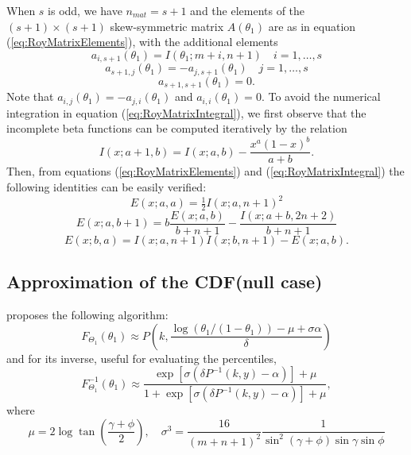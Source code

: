 When $s$ is odd, we have $n_{mat} = s+1$ and the elements of the $(s+1) \times (s+1)$ skew-symmetric matrix $A(\theta_1)$ are as in equation (\ref{eq:RoyMatrixElements}), with the additional elements
\begin{equation}
	a_{i,s+1}(\theta_1) = I(\theta_1;m + i,n + 1) \quad i = 1, \ldots, s 
\end{equation}
\begin{equation}
	a_{s+1,j}(\theta_1) = -a_{j,s+1}(\theta_1) \quad j = 1, \ldots, s 
\end{equation}
\begin{equation}
	a_{s+1,s+1}(\theta_1) = 0.
\end{equation}
Note that $a_{i,j}(\theta_1) = -a_{j,i}(\theta_1)$ and $a_{i,i}(\theta_1)=0$. To avoid the numerical integration in equation (\ref{eq:RoyMatrixIntegral}), we first observe that the incomplete beta functions can be computed iteratively by the relation
\begin{equation}
	I(x;a+1,b) = I(x;a,b) - \frac{x^a(1-x)^b}{a+b}.
\end{equation}
Then, from equations (\ref{eq:RoyMatrixElements}) and (\ref{eq:RoyMatrixIntegral}) the following identities can be easily verified:
\begin{equation}
	E(x;a,a) = \tfrac{1}{2} I(x;a,n+1)^2 
\end{equation}
\begin{equation}
	E(x;a,b+1) = b \frac{E(x;a,b)}{b+n+1} - \frac{I(x;a+b,2n+2)}{b+n+1}
\end{equation}
\begin{equation}
	E(x;b,a) = I(x;a,n+1) I(x;b,n+1) - E(x;a,b).
\end{equation}



\subsection{Approximation of the CDF(null case)}
\cite{Chiani_2014} proposes the following algorithm:
\begin{equation}
	F_{\Theta_1}(\theta_1) \approx P \left(k, \frac{\log(\theta_1/(1-\theta_1))-\mu + \sigma \alpha}{\delta}  \right)
\end{equation}
and for its inverse, useful for evaluating the percentiles,
\begin{equation}
	F_{\Theta_1}^{-1}(\theta_1) \approx \frac{\exp[\sigma(\delta P^{-1}(k,y)-\alpha)]+\mu}{1+\exp[\sigma(\delta P^{-1}(k,y)-\alpha)]+\mu}, 
\end{equation}
where
\begin{equation}
	\mu = 2 \log \tan \left(\frac{\gamma + \phi}{2}\right), \quad \sigma^3 = \frac{16}{(m+n+1)^2} \frac{1}{\sin^2(\gamma + \phi) \sin \gamma \sin \phi}
\end{equation}

